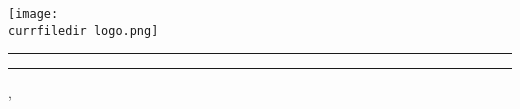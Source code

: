 \clearpage

\pagestyle{blank}


\begin{titlepage}
    \centering

    \textbf{\uppercase{\Large\university}}

    \uppercase{\faculty}

    \vspace{64pt}

    \texttt{[image: \\currfiledir logo.png]}

    \vspace{64pt}

    \textbf{\uppercase{\large {}}}

    \parbox[c][\baselineskip]{\textwidth}{\vfill\rule{\textwidth}{0.5pt}\vfill}

    \hspace{0.1\textwidth}
    \textbf{\textit{\uppercase{\Large {}}}}
    \hspace{0.1\textwidth}

    \parbox[c][\baselineskip]{\textwidth}{\vfill\rule{\textwidth}{0.5pt}\vfill}

    \vspace{\baselineskip}

    \begin{minipage}{0.25\linewidth}
    \end{minipage}%
    \begin{minipage}[t]{0.75\linewidth}
        \ifthenelse{\equal{\group}{}}{\dotfill}{\group}
    \end{minipage}

    \vspace{\baselineskip}

    \begin{minipage}{0.25\linewidth}
    \end{minipage}%
    \begin{minipage}[t]{0.75\linewidth}
        \ifthenelse{\equal{\instructors}{}}{\dotfill}{\instructors}
    \end{minipage}

    \vspace{\baselineskip}

    \begin{minipage}{0.25\linewidth}
    \end{minipage}%
    \begin{minipage}[t]{0.75\linewidth}
        \ifthenelse{\equal{\implementers}{}}{\dotfill}{\implementers}
    \end{minipage}

    \vfill

    \location, 

\end{titlepage}

\clearpage

